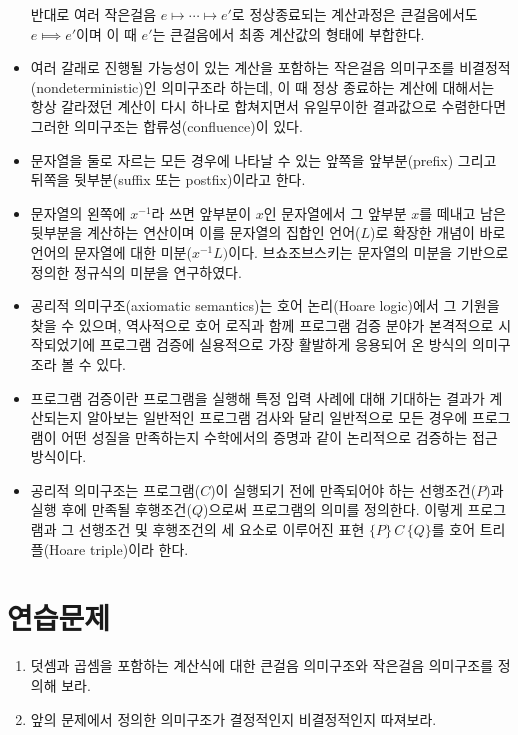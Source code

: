 \begin{itemize}[itemsep=0pt]
       반대로 여러 작은걸음 $e\longmapsto \cdots \longmapsto e'$로
       정상종료되는 계산과정은 큰걸음에서도 $e\Longmapsto e'$이며 이 때
       $e'$는 큰걸음에서 최종 계산값의 형태에 부합한다.
 \item 여러 갈래로 진행될 가능성이 있는 계산을 포함하는 작은걸음 의미구조를
       비결정적(nondeterministic)인 의미구조라 하는데, 이 때 정상 종료하는
       계산에 대해서는 항상 갈라졌던 계산이 다시 하나로 합쳐지면서 유일무이한
       결과값으로 수렴한다면 그러한 의미구조는 합류성(confluence)이 있다.
 \item 문자열을 둘로 자르는 모든 경우에 나타날 수 있는 앞쪽을 앞부분(prefix)
       그리고 뒤쪽을 뒷부분(suffix 또는 postfix)이라고 한다.
 \item 문자열의 왼쪽에 $x^{-1}$라 쓰면 앞부분이 $x$인 문자열에서 그 앞부분 $x$를
       떼내고 남은 뒷부분을 계산하는 연산이며 이를 문자열의 집합인 언어($L$)로
       확장한 개념이 바로 언어의 문자열에 대한 미분($x^{-1} L)$이다.
       브쇼조브스키는 문자열의 미분을 기반으로 정의한 정규식의 미분을 연구하였다.
 \item 공리적 의미구조(axiomatic semantics)는 호어 논리(Hoare logic)에서
       그 기원을 찾을 수 있으며, 역사적으로 호어 로직과 함께 프로그램
       검증 분야가 본격적으로 시작되었기에 프로그램 검증에 실용적으로
       가장 활발하게 응용되어 온 방식의 의미구조라 볼 수 있다.
 \item 프로그램 검증이란 프로그램을 실행해 특정 입력 사례에 대해 기대하는
       결과가 계산되는지 알아보는 일반적인 프로그램 검사와 달리 일반적으로
       모든 경우에 프로그램이 어떤 성질을 만족하는지 수학에서의 증명과 같이
       논리적으로 검증하는 접근 방식이다.
 \item 공리적 의미구조는 프로그램($C$)이 실행되기 전에 만족되어야 하는
       선행조건($P$)과 실행 후에 만족될 후행조건($Q$)으로써 프로그램의
       의미를 정의한다. 이렇게 프로그램과 그 선행조건 및 후행조건의
       세 요소로 이루어진 표현 $\{P\}\,C\,\{Q\}$를
       호어 트리플(Hoare triple)이라 한다.
\end{itemize}

\section*{연습문제}
\begin{enumerate}[itemsep=0pt]
 \item 덧셈과 곱셈을 포함하는 계산식에 대한
       큰걸음 의미구조와 작은걸음 의미구조를 정의해 보라.
 \item 앞의 문제에서 정의한 의미구조가 결정적인지 비결정적인지 따져보라.
\end{enumerate}


